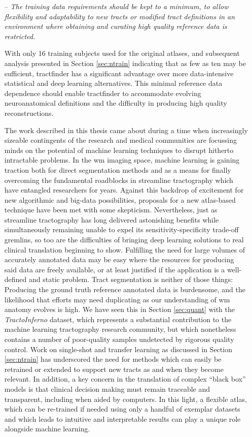 \begin{itemize}
\item[--]\textit{The training data requirements should be kept to a minimum, to allow flexibility and adaptability to new tracts or modified tract definitions in an environment where obtaining and curating high quality reference data is restricted.}

With only 16 training subjects used for the original atlases, and subsequent analysis presented in Section \ref{sec:ntrain} indicating that as few as ten may be sufficient, tractfinder has a significant advantage over more data-intensive statistical and deep learning alternatives.
This minimal reference data dependence should enable tractfinder to accommodate evolving neuroanatomical definitions and the difficulty in producing high quality reconstructions.

The work described in this thesis came about during a time when increasingly sizeable contingents of the research and medical communities are focussing minds on the potential of machine learning techniques to disrupt hitherto intractable problems.
In the \gls{wm} imaging space, machine learning is gaining traction both for direct segmentation methods and as a means for finally overcoming the fundamental roadblocks in streamline tractography which have entangled researchers for years.
Against this backdrop of excitement for new algorithmic and big-data possibilities, proposals for a new atlas-based technique have been met with some skepticism.
Nevertheless, just as streamline tractography has long delivered astonishing benefits while simultaneously remaining unable to expel its sensitivity-specificity trade-off gremlins, so too are the difficulties of bringing deep learning solutions to real clinical translation beginning to show.
Fulfilling the need for large volumes of accurately annotated data may be easy where the resources for producing said data are freely available, or at least justified if the application is a well-defined and static problem.
Tract segmentation is neither of those things:
Producing the ground truth reference annotated data is burdensome, and the likelihood that efforts may need duplicating as our understanding of \gls{wm} anatomy evolves is high.
We have seen this in Section \ref{sec:quant} with the \textit{TractoInferno} dataset, which represents a substantial contribution to the machine learning tractography research community, but which nonetheless contains a number of poor-quality samples undetected by rigorous quality control.
Work on single-shot and transfer learning as discussed in Section \ref{sec:ntrain} has underscored the need for methods which can easily be retrained or extended to support new tracts as and when they become relevant.
In addition, a key concern in the translation of complex ``black box'' models is that clinical decision making must remain traceable and transparent, including when aided by computers.
In this light, a flexible atlas, which can be re-trained if needed using only a handful of exemplar datasets and which leads to intuitive and interpretable results can play a unique role alongside machine learning.

\end{itemize}

